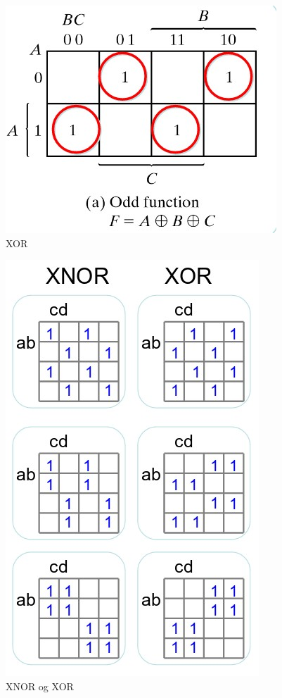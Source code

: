 \documentclass{article}
\begin{document}
	\begin{figure}[H]
		\includegraphics[scale = 0.6]{XOR.jpg}
		\caption{XOR}
	\end{figure}
	
	\begin{figure}[H]
		\includegraphics[scale = 0.7]{X.jpg}
		\caption{XNOR og XOR}
	\end{figure}
	
\end{document}
